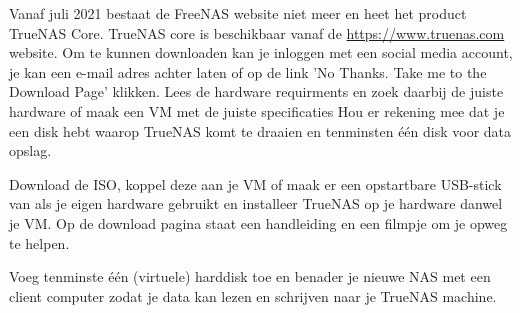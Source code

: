 Vanaf juli 2021 bestaat de FreeNAS website niet meer en heet het product TrueNAS Core. TrueNAS core is beschikbaar vanaf de \url{https://www.truenas.com} website. Om te kunnen downloaden kan je inloggen met een social media account, je kan een e-mail adres achter laten of op de link 'No Thanks. Take me to the Download Page' klikken. Lees de hardware requirments en zoek daarbij de juiste hardware of maak een VM met de juiste specificaties Hou er rekening mee dat je een disk hebt waarop TrueNAS komt te draaien en tenminsten \'e\'en disk voor data opslag.

Download de ISO, koppel deze aan je VM of maak er een opstartbare USB-stick van als je eigen hardware gebruikt en installeer TrueNAS op je hardware danwel je VM. Op de download pagina staat een handleiding en een filmpje om je opweg te helpen.

Voeg tenminste \'e\'en (virtuele) harddisk toe en benader je nieuwe NAS met een client computer zodat je data kan lezen en schrijven naar je TrueNAS machine.
